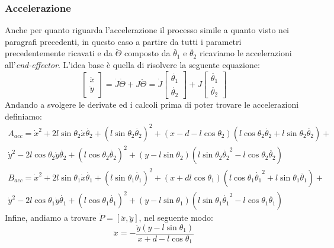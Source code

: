 \subsubsection{Accelerazione}
Anche per quanto riguarda l'accelerazione il processo  simile a quanto visto nei paragrafi precedenti, in questo caso a partire da tutti i parametri precedentemente ricavati e da $\ddot{\Theta}$ composto da $\ddot{\theta_1}$ e $\ddot{\theta_2}$ ricaviamo le accelerazioni all'\textit{end-effector}. L'idea base è quella di risolvere la seguente equazione:
\begin{equation}
	\begin{bmatrix}
		\ddot{x} \\ \ddot{y}
	\end{bmatrix} = \dot{J}\dot{\Theta} + J\ddot{\Theta} = \dot{J}\begin{bmatrix}
	\dot{\theta_1} \\ \dot{\theta_2}
\end{bmatrix} + J \begin{bmatrix}
\ddot{\theta_1} \\ \ddot{\theta_2}
\end{bmatrix}
\end{equation}
Andando a svolgere le derivate ed i calcoli prima di poter trovare le accelerazioni definiamo: 
\begin{equation*}
\begin{aligned}
    A_{acc} = \dot{x}^2 + 2l\sin\theta_2\dot{x}\dot{\theta_2}+(l\sin\theta_2\dot{\theta_2})^2 + (x-d-l\cos\theta_2)(l\cos\theta_2\dot{\theta_2}+l\sin\theta_2\ddot{\theta_2}) +\\ \dot{y}^2-2l\cos\theta_2\dot{y}\dot{\theta_2}+(l\cos\theta_2\dot{\theta_2})^2+(y-l\sin\theta_2)(l\sin\theta_2\dot{\theta_2}^2-l\cos\theta_2\ddot{\theta_2})
    \end{aligned}
\end{equation*}
\begin{equation*}
    \begin{aligned}
    B_{acc} = \dot{x}^2+2l\sin\theta_1\dot{x}\dot{\theta_1} + (l\sin\theta_1\dot{\theta_1})^2+(x+dl\cos\theta_1)(l\cos\theta_1\dot{\theta_1}^2+l\sin\theta_1\ddot{\theta_1})+
    \\ \dot{y}^2 -2l\cos\theta_1 \dot{y}\dot{\theta_1}+(l\cos\theta_1\dot{\theta_1})^2+(y-l\sin\theta_1)(l\sin\theta_1\dot{\theta_1}^2-l\cos\theta_1\ddot{\theta_1})
    \end{aligned}
\end{equation*}
Infine, andiamo a trovare $\ddot{P} = [\ddot{x},\ddot{y}]$, nel seguente modo:
\begin{equation}
	\ddot{x} = - \frac{\ddot{y}(y-l\sin\theta_1)}{x+d-l\cos\theta_1}
\end{equation}

